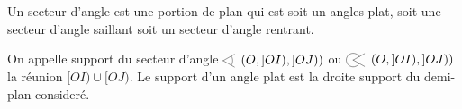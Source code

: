 \begin{defi}    
    Un secteur d'angle est une portion de plan qui est soit un angles plat, soit une secteur d'angle saillant soit un secteur d'angle rentrant. 
\end{defi}

\begin{defi}
    On appelle support du secteur d'angle $\anglesaillant\left({O},{]OI)},{]OJ)}\right)$ ou $\anglerentrant \left({O},{]OI)},{]OJ)}\right)$ la réunion $[OI)\cup[OJ)$. Le support d'un angle plat est la droite support du demi-plan consideré.
\end{defi}

